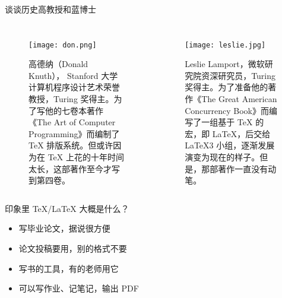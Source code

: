 \begin{frame}
\titlepage
\end{frame}

\begin{frame}{谈谈历史}{高教授和蓝博士}
\begin{columns}
\begin{figure}
\texttt{[image: don.png]}
\caption{\normalparagraph
高德纳（Donald Knuth）， Stanford 大学计算机程序设计艺术荣誉教授，Turing 奖得主。为了写他的七卷本著作《The Art of Computer Programming》而编制了 \TeX{} 排版系统。但或许因为在 \TeX{} 上花的十年时间太长，这部著作至今才写到第四卷。}
\end{figure}

\begin{figure}
\texttt{[image: leslie.jpg]}
\caption{\normalparagraph
Leslie Lamport，微软研究院资深研究员，Turing 奖得主。为了准备他的著作《The Great American Concurrency Book》而编写了一组基于 \TeX{} 的宏，即 \LaTeX{}，后交给 \LaTeX3 小组，逐渐发展演变为现在的样子。但是，那部著作一直没有动笔。}
\end{figure}
\end{columns}
\strut
\end{frame}

\begin{frame}{印象里 \TeX/\LaTeX{} 大概是什么？}
\begin{itemize}[<+->]
\item 写毕业论文，据说很方便
\item 论文投稿要用，别的格式不要
\item 写书的工具，有的老师用它
\item 可以写作业、记笔记，输出 PDF
\end{itemize}
\end{frame}

